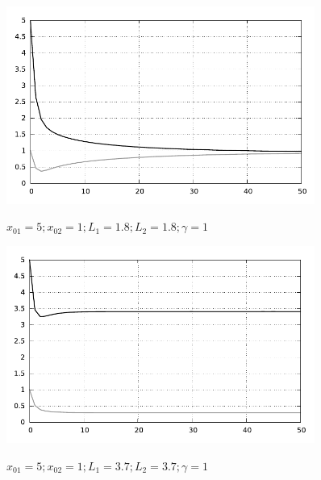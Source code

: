 \begin{figure}[h!]
    \center
    \includegraphics[width=0.9\textwidth]{images/graph_0001}
    \parbox{.8\textwidth}{ \centering
    \( x_{01} = 5; x_{02} = 1; L_1 = 1.8; L_2 = 1.8; \gamma = 1 \)}
    \includegraphics[width=0.9\textwidth]{images/graph_0002}
    \parbox{.8\textwidth}{ \centering
    \( x_{01} = 5; x_{02} = 1; L_1 = 3.7; L_2 = 3.7; \gamma = 1 \)}
\end{figure}
